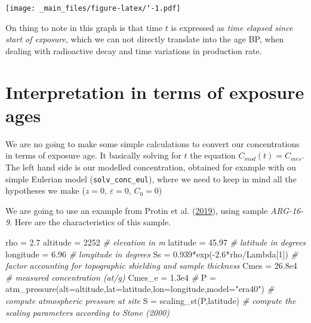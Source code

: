 \documentclass[
]{book}
\newenvironment{Shaded}{\begin{snugshade}}{\end{snugshade}}
\newcommand{\AttributeTok}[1]{\textcolor[rgb]{0.77,0.63,0.00}{#1}}
\newcommand{\CommentTok}[1]{\textcolor[rgb]{0.56,0.35,0.01}{\textit{#1}}}
\newcommand{\DecValTok}[1]{\textcolor[rgb]{0.00,0.00,0.81}{#1}}
\newcommand{\FloatTok}[1]{\textcolor[rgb]{0.00,0.00,0.81}{#1}}
\newcommand{\FunctionTok}[1]{\textcolor[rgb]{0.00,0.00,0.00}{#1}}
\newcommand{\NormalTok}[1]{#1}
\newcommand{\OtherTok}[1]{\textcolor[rgb]{0.56,0.35,0.01}{#1}}
\newcommand{\SpecialCharTok}[1]{\textcolor[rgb]{0.00,0.00,0.00}{#1}}
\newcommand{\StringTok}[1]{\textcolor[rgb]{0.31,0.60,0.02}{#1}}
\begin{document}
\texttt{[image: \_main\_files/figure-latex/`-1.pdf]}

On thing to note in this graph is that time \(t\) is expressed as \emph{time elapsed since start of exposure}, which we can not directly translate into the age BP, when dealing with radioactive decay and time variations in production rate.

\hypertarget{interpretation-in-terms-of-exposure-ages}{%
\section{Interpretation in terms of exposure ages}\label{interpretation-in-terms-of-exposure-ages}}

We are no going to make some simple calculations to convert our concentrations in terms of exposure age.
It basically solving for \(t\) the equation \(C_{mod}(t) = C_{mes}\). The left hand side is our modelled concentration, obtained for example with ou simple Eulerian model (\texttt{solv\_conc\_eul}), where we need to keep in mind all the hypotheses we make (\(z=0\), \(\varepsilon=0\), \(C_0=0\))

We are going to use an example from Protin et al. (\protect\hyperlink{ref-protin2019climatic}{2019}), using sample \emph{ARG-16-9}. Here are the characteristics of this sample.

\begin{Shaded}
\begin{Highlighting}[]
\NormalTok{rho }\OtherTok{=} \FloatTok{2.7}
\NormalTok{altitude }\OtherTok{=} \DecValTok{2252} \CommentTok{\# elevation in m}
\NormalTok{latitude }\OtherTok{=} \FloatTok{45.97} \CommentTok{\# latitude in degrees}
\NormalTok{longitude }\OtherTok{=} \FloatTok{6.96} \CommentTok{\# longitude in degrees}
\NormalTok{Ss }\OtherTok{=} \FloatTok{0.939}\SpecialCharTok{*}\FunctionTok{exp}\NormalTok{(}\SpecialCharTok{{-}}\FloatTok{2.6}\SpecialCharTok{*}\NormalTok{rho}\SpecialCharTok{/}\NormalTok{Lambda[}\DecValTok{1}\NormalTok{]) }\CommentTok{\# factor accounting for topographic shielding and sample thickness}
\NormalTok{Cmes }\OtherTok{=} \FloatTok{26.8e4} \CommentTok{\# measured concentration (at/g)}
\NormalTok{Cmes\_e }\OtherTok{=} \FloatTok{1.3e4}
\CommentTok{\#}
\NormalTok{P }\OtherTok{=} \FunctionTok{atm\_pressure}\NormalTok{(}\AttributeTok{alt=}\NormalTok{altitude,}\AttributeTok{lat=}\NormalTok{latitude,}\AttributeTok{lon=}\NormalTok{longitude,}\AttributeTok{model=}\StringTok{"era40"}\NormalTok{) }\CommentTok{\# compute atmospheric pressure at site}
\NormalTok{S }\OtherTok{=} \FunctionTok{scaling\_st}\NormalTok{(P,latitude) }\CommentTok{\# compute the scaling parameters according to Stone (2000)}
\end{Highlighting}
\end{Shaded}
\end{document}
